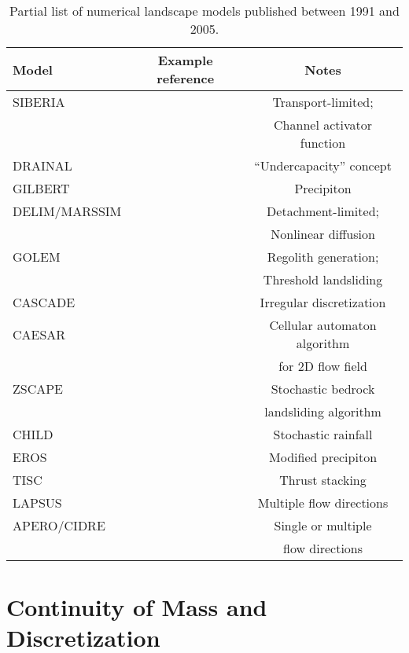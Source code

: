 \documentclass[12pt]{amsart}
\begin{document}
\begin{center}
\begin{table}
\caption{Partial list of numerical landscape models published between 1991 and 2005.}
\small
 \begin{tabular}{ l c c}
   \hline
   Model & Example reference & Notes\\
   \hline
   SIBERIA & \citet{willgoose1991coupled} & Transport-limited; \\
   & & Channel activator function \\
   DRAINAL & \citet{beaumont1992erosional} & ``Undercapacity'' concept \\
   GILBERT & \citet{chase1992fluvial} & Precipiton \\
   DELIM/MARSSIM & \citet{howard1994detachment} & Detachment-limited; \\
   & & Nonlinear diffusion \\
   GOLEM & \citet{tucker1994erosional} & Regolith generation; \\
   & & Threshold landsliding \\
   CASCADE & \citet{braun1997modelling} & Irregular discretization \\
   CAESAR & \citet{coulthard1996cellular} & Cellular automaton algorithm \\
   & & for 2D flow field \\
   ZSCAPE & \citet{densmore1998landsliding} & Stochastic bedrock \\
   & & landsliding algorithm \\
   CHILD & \citet{tucker2000stochastic} & Stochastic rainfall \\
   EROS & \citet{crave2001stochastic} & Modified precipiton \\
   TISC & \citet{garcia2002interplay} & Thrust stacking \\
   LAPSUS & \citet{schoorl2002modeling} & Multiple flow directions \\
   APERO/CIDRE & \citet{carretier2005does} & Single or multiple \\
   & & flow directions \\
   \hline
  \end{tabular}
  \normalsize
  \label{table1}
 \end{table}
\end{center}


\section{Continuity of Mass and Discretization}
\end{document}
